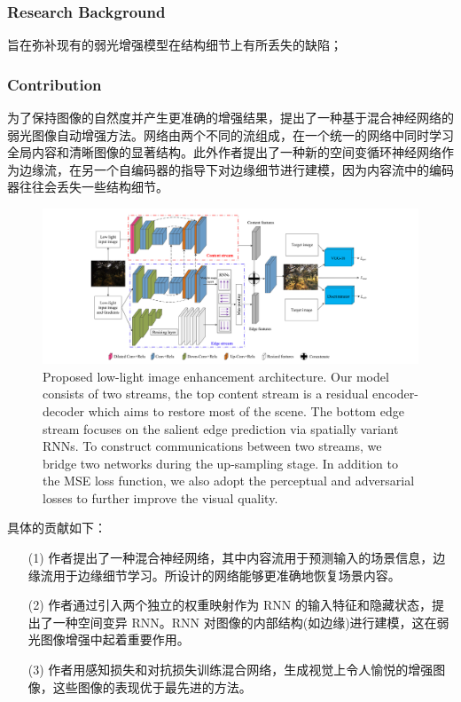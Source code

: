 \documentclass[a4paper, 10pt]{article}
\begin{document}
			\subsubsection{Research Background}
			
			旨在弥补现有的弱光增强模型在结构细节上有所丢失的缺陷；
			
			\subsubsection{Contribution}

			为了保持图像的自然度并产生更准确的增强结果，提出了一种基于混合神经网络的弱光图像自动增强方法。网络由两个不同的流组成，在一个统一的网络中同时学习全局内容和清晰图像的显著结构。此外作者提出了一种新的空间变循环神经网络作为边缘流，在另一个自编码器的指导下对边缘细节进行建模，因为内容流中的编码器往往会丢失一些结构细节。
			
			\begin{figure}[htbp]
				\centering 
				\includegraphics[width=\columnwidth]{picture/LLIE/DHN/Architecture}
				\caption{
					\label{fig: DHN Architecture} 
					Proposed low-light image enhancement architecture. Our model consists of two streams, the top content stream is a residual encoder-decoder which aims to restore most of the scene. The bottom edge stream focuses on the salient edge prediction via spatially variant RNNs. To construct communications between two streams, we bridge two networks during the up-sampling stage. In addition to the MSE loss function, we also adopt the perceptual and adversarial
					losses to further improve the visual quality.
				}
			\end{figure}
			
			具体的贡献如下：
			
			\begin{itemize}
				\item[(1)] 
				作者提出了一种混合神经网络，其中内容流用于预测输入的场景信息，边缘流用于边缘细节学习。所设计的网络能够更准确地恢复场景内容。
				
				\item[(2)]
				作者通过引入两个独立的权重映射作为 RNN 的输入特征和隐藏状态，提出了一种空间变异 RNN。RNN 对图像的内部结构(如边缘)进行建模，这在弱光图像增强中起着重要作用。
				
				\item[(3)]
				作者用感知损失和对抗损失训练混合网络，生成视觉上令人愉悦的增强图像，这些图像的表现优于最先进的方法。
			\end{itemize}	
			
\end{document}
